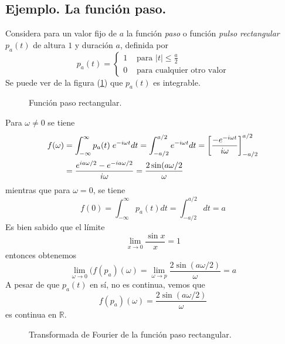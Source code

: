 \subsection*{Ejemplo. La función paso.}
Considera para un valor fijo de $a$ la función \emph{paso} o función \emph{pulso rectangular} $p_{a}(t)$ de altura $1$ y duración $a$, definida por
\begin{equation}
p_{a}(t) = \begin{cases}
1 & \text{ para } \vert t \vert \leq \frac{a}{2} \\
0 & \text{ para cualquier otro valor} \end{cases}
\label{eq:ecuacion_06_10_Beerends}
\end{equation}
Se puede ver de la figura (\ref{fig:figura_funcionpaso}) que $p_{a}(t)$ es integrable.
\begin{figure}[H]
\centering

\caption{Función paso rectangular.}
\label{fig:figura_funcionpaso}
\end{figure}
Para $\omega \neq 0$ se tiene
\begin{align*}
f(\omega) &= \int_{-\infty}^{\infty} p_{a}(t) \; e^{-i \omega t} dt = \int_{-a/2}^{a/2} e^{-i \omega t} dt = \left[ \dfrac{- e^{- i \omega t}}{i \omega} \right]_{-a/2}^{a/2} \nonumber \\
&= \dfrac{e^{ia\omega/2} - e^{-i a \omega/2}}{i \omega} = \dfrac{2 \sin (a \omega/2}{\omega}
\end{align*}
mientras que para $\omega = 0$, se tiene
\begin{equation*}
f(0) = \int_{-\infty}^{\infty} p_{a}(t) dt = \int_{-a/2}^{a/2} dt =  a
\end{equation*}
Es bien sabido que el límite 
\[ \lim_{x \to 0} \dfrac{\sin x}{x} = 1 \]
entonces obtenemos 
\[ \lim_{\omega \to 0} (f(p_{a})(\omega) = \lim_{\omega \to p} \dfrac{2 \sin (a \omega /2)}{\omega} = a \]
A pesar de que $p_{a}(t)$ en sí, no es continua, vemos que
\begin{equation}
f(p_{a})(\omega) = \dfrac{2 \sin (a \omega/2)}{\omega}
\label{eq:ecuacion_06_11_Beerends}
\end{equation}
es continua en $\mathbb{R}$.
\begin{figure}[H]
\centering

\caption{Transformada de Fourier de la función paso rectangular.}
\label{fig:figura_Tfuncionpaso}
\end{figure}
